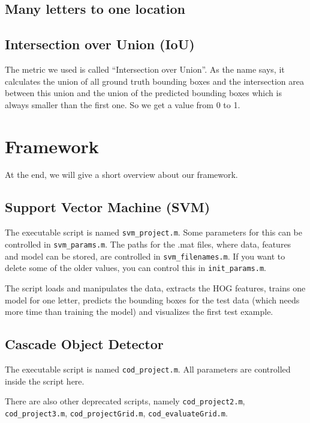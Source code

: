 \documentclass[conference]{IEEEtran}
\begin{document}
\subsection{Many letters to one location}\label{sec:many-to-one} %


\subsection{Intersection over Union (IoU)}\label{sec:iou}

The metric we used is called ``Intersection over Union''. As the name says, it calculates the union of all ground truth bounding boxes and the intersection area between this union and the union of the predicted bounding boxes which is always smaller than the first one. So we get a value from 0 to 1.

\section{Framework}

At the end, we will give a short overview about our framework.

\subsection{Support Vector Machine (SVM)}

The executable script is named \texttt{svm\_project.m}. Some parameters for this can be controlled in \texttt{svm\_params.m}. The paths for the .mat files, where data, features and model can be stored, are controlled in \texttt{svm\_filenames.m}. If you want to delete some of the older values, you can control this in \texttt{init\_params.m}.

The script loads and manipulates the data, extracts the HOG features, trains one model for one letter, predicts the bounding boxes for the test data (which needs more time than training the model) and visualizes the first test example.

\subsection{Cascade Object Detector}

The executable script is named \texttt{cod\_project.m}. All parameters are controlled inside the script here.

There are also other deprecated scripts, namely \texttt{cod\_project2.m}, \texttt{cod\_project3.m}, \texttt{cod\_projectGrid.m}, \texttt{cod\_evaluateGrid.m}.
\end{document}
